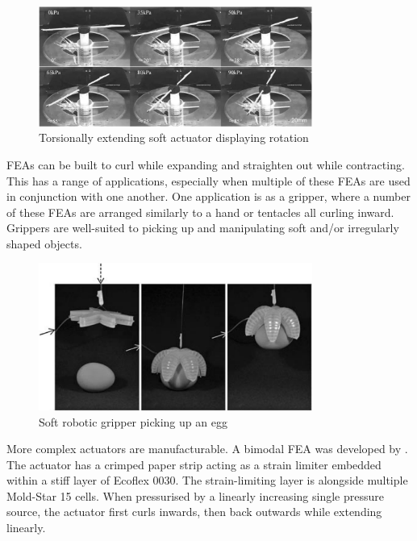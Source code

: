 \begin{figure}[H]
	\centering
	\includegraphics[width=0.8\textwidth]{TorsionalExtension.png}
	\caption[Torsionally extending soft actuator]{Torsionally extending soft actuator displaying rotation \citep{Yan2018}}
	\label{fig:tea}
\end{figure}

FEAs can be built to curl while expanding and straighten out while contracting. This has a range of applications, especially when multiple of these FEAs are used in conjunction with one another. One application is as a gripper, where a number of these FEAs are arranged similarly to a hand or tentacles all curling inward. Grippers are well-suited to picking up and manipulating soft and/or irregularly shaped objects. \citep{Ilievski2011}

\begin{figure}[H]
	\centering
	\includegraphics[width=0.8\textwidth]{Gripper.png}
	\caption[Soft robotic gripper]{Soft robotic gripper picking up an egg \citep{Ilievski2011}}
	\label{fig:grip}
\end{figure}

More complex actuators are manufacturable. A bimodal FEA was developed by \cite{Ellis2020}. The actuator has a crimped paper strip acting as a strain limiter embedded within a stiff layer of Ecoflex 0030. The strain-limiting layer is alongside multiple Mold-Star 15 cells. When pressurised by a linearly increasing single pressure source, the actuator  first curls inwards, then back outwards while extending linearly. \citep{Ellis2020}

